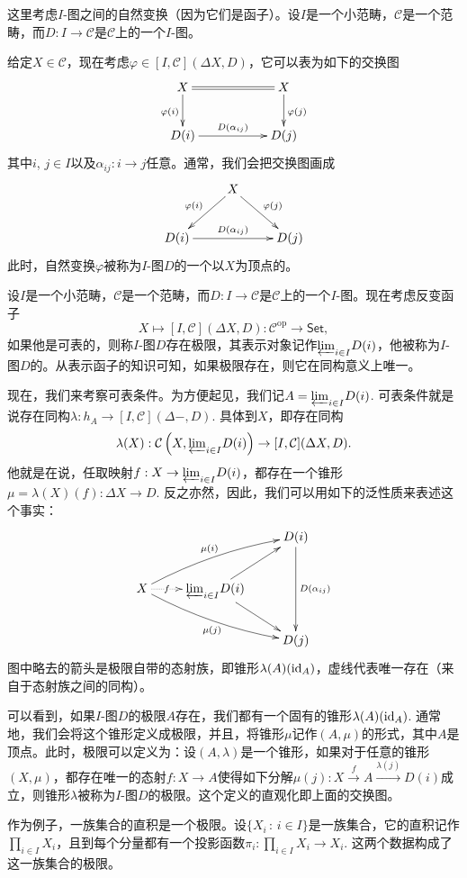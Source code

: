 \para 这里考虑$I$-图之间的自然变换（因为它们是函子）。设$I$是一个小范畴，$\mathcal{C}$是一个范畴，而$D:I\to \mathcal{C}$是$\mathcal{C}$上的一个$I$-图。

给定$X\in\mathcal{C}$，现在考虑$\varphi\in [I,\mathcal{C}](\Delta X,D)$，它可以表为如下的交换图
\[
	\xymatrix{
		X\ar@{=}[rr]\ar[d]_{\varphi(i)}&&X\ar[d]^{\varphi(j)}\\
		D(i)\ar[rr]^-{D(\alpha_{ij})}&&D(j)
	}
\]
其中$i$, $j\in I$以及$\alpha_{ij}:i\to j$任意。通常，我们会把交换图画成
\[
	\xymatrix{
		&X\ar[dl]_{\varphi(i)}\ar[dr]^{\varphi(j)}&\\
		D(i)\ar[rr]^-{D(\alpha_{ij})}&&D(j)
	}
\]
此时，自然变换$\varphi$被称为$I$-图$D$的一个以$X$为顶点的。

\para 设$I$是一个小范畴，$\mathcal{C}$是一个范畴，而$D:I\to \mathcal{C}$是$\mathcal{C}$上的一个$I$-图。现在考虑反变函子
\[
	X\mapsto [I,\mathcal{C}](\Delta X,D):\mathcal{C}^{\text{op}}\to \mathsf{Set},
\]
如果他是可表的，则称$I$-图$D$存在极限，其表示对象记作${\varprojlim}_{i\in I} D(i)$，他被称为$I$-图$D$的。从表示函子的知识可知，如果极限存在，则它在同构意义上唯一。

现在，我们来考察可表条件。为方便起见，我们记$A={\varprojlim}_{i\in I} D(i)$. 可表条件就是说存在同构$\lambda:h_{A}\to [I,\mathcal{C}](\Delta -,D)$. 具体到$X$，即存在同构
\[
	\lambda(X):\mathcal{C}\left(X,{\varprojlim}_{i\in I} D(i)\right)\to [I,\mathcal{C}](\Delta X,D).
\]
他就是在说，任取映射$f:X\to {\varprojlim}_{i\in I} D(i)$，都存在一个锥形$\mu=\lambda(X)(f):\Delta X\to D$. 反之亦然，因此，我们可以用如下的泛性质来表述这个事实：
\[
	\xymatrix{
		&&D(i)\ar[dd]^{D(\alpha_{ij})}\\
		X\ar@{.>}[r]|-{f}\ar@/^/[rru]^-{\mu(i)}\ar@/_/[rrd]_{\mu(j)}&{\varprojlim}_{i\in I} D(i)\ar[ru]\ar[rd]&\\
		&&D(j)
	}
\]
图中略去的箭头是极限自带的态射族，即锥形$\lambda(A)(\operatorname{id}_A)$，虚线代表唯一存在（来自于态射族之间的同构）。

可以看到，如果$I$-图$D$的极限$A$存在，我们都有一个固有的锥形$\lambda(A)(\operatorname{id}_A)$. 通常地，我们会将这个锥形定义成极限，并且，将锥形$\mu$记作$(A,\mu)$的形式，其中$A$是顶点。此时，极限可以定义为：设$(A,\lambda)$是一个锥形，如果对于任意的锥形$(X,\mu)$，都存在唯一的态射$f:X\to A$使得如下分解$\mu(j):X\xrightarrow{f}A\xrightarrow{\lambda(j)}D(i)$成立，则锥形$\lambda$被称为$I$-图$D$的极限。这个定义的直观化即上面的交换图。

作为例子，一族集合的直积是一个极限。设$\{X_i\,:\, i\in I\}$是一族集合，它的直积记作$\prod_{i\in I}X_i$，且到每个分量都有一个投影函数$\pi_i:\prod_{i\in I}X_i\to X_i$. 这两个数据构成了这一族集合的极限。

